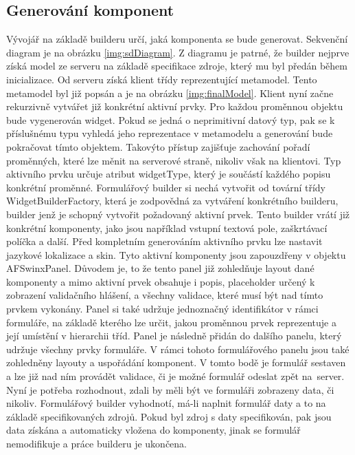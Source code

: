 \subsection{Generování komponent}
Vývojář na základě builderu určí, jaká komponenta se bude generovat. Sekvenční diagram je na obrázku \ref{img:sdDiagram}. Z diagramu je patrné, že builder nejprve získá model ze serveru na základě specifikace zdroje, který mu byl předán během inicializace. Od serveru získá klient třídy reprezentující metamodel. Tento metamodel byl již popsán a je na obrázku \ref{img:finalModel}. Klient nyní začne rekurzivně vytvářet již konkrétní aktivní prvky. Pro každou proměnnou objektu bude vygenerován widget. Pokud se jedná o neprimitivní datový typ, pak se k příslušnému typu vyhledá jeho reprezentace v metamodelu a generování bude pokračovat tímto objektem. Takovýto přístup zajišťuje zachování pořadí proměnných, které lze měnit na serverové straně, nikoliv však na klientovi. Typ aktivního prvku určuje atribut widgetType, který je součástí každého popisu konkrétní proměnné. Formulářový builder si nechá vytvořit od tovární třídy WidgetBuilderFactory, která je zodpovědná za vytváření konkrétního builderu, builder jenž je schopný vytvořit požadovaný aktivní prvek. Tento builder vrátí již konkrétní komponenty, jako jsou například vstupní textová pole, zaškrtávací políčka a další. Před kompletním generováním aktivního prvku lze nastavit jazykové lokalizace a skin. Tyto aktivní komponenty jsou zapouzdřeny v objektu AFSwinxPanel. Důvodem je, to že tento panel již zohledňuje layout dané komponenty a mimo aktivní prvek obsahuje i popis, placeholder určený k zobrazení validačního hlášení, a všechny validace, které musí být nad tímto prvkem vykonány. Panel si také udržuje jednoznačný identifikátor v rámci formuláře, na základě kterého lze určit, jakou proměnnou prvek reprezentuje a její umístění v hierarchii tříd. Panel je následně přidán do dalšího panelu, který udržuje všechny prvky formuláře. V rámci tohoto formulářového panelu jsou také zohledněny layouty a uspořádání komponent. V tomto bodě je formulář sestaven a lze již nad ním provádět validace, či je možné formulář odeslat zpět na~server. Nyní je potřeba rozhodnout, zdali by měli být ve formuláři zobrazeny data, či nikoliv. Formulářový builder vyhodnotí, má-li naplnit formulář daty a to na základě specifikovaných zdrojů. Pokud byl zdroj s daty specifikován, pak jsou data získána a automaticky vložena do komponenty, jinak se formulář nemodifikuje a práce builderu je ukončena.

